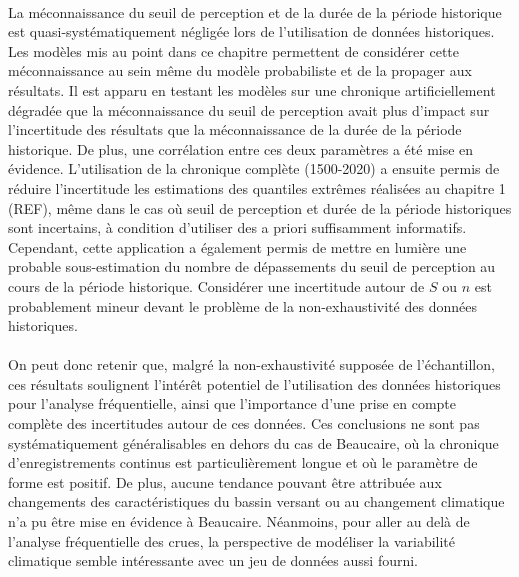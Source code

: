 \documentclass[11pt]{article}
\begin{document}
	\paragraph{} La méconnaissance du seuil de perception et de la durée de la période historique est quasi-systématiquement négligée lors de l'utilisation de données historiques. Les modèles mis au point dans ce chapitre permettent de considérer cette méconnaissance au sein même du modèle probabiliste et de la propager aux résultats. Il est apparu en testant les modèles sur une chronique artificiellement dégradée que la méconnaissance du seuil de perception avait plus d'impact sur l'incertitude des résultats que la méconnaissance de la durée de la période historique. De plus, une corrélation entre ces deux paramètres a été mise en évidence. L'utilisation de la chronique complète (1500-2020) a ensuite permis de réduire l'incertitude les estimations des quantiles extrêmes réalisées au chapitre 1 (REF), même dans le cas où seuil de perception et durée de la période historiques sont incertains, à condition d'utiliser des a priori suffisamment informatifs. Cependant, cette application a également permis de mettre en lumière une probable sous-estimation du nombre de dépassements du seuil de perception au cours de la période historique. Considérer une incertitude autour de $S$ ou $n$ est probablement mineur devant le problème de la non-exhaustivité des données historiques.

	\paragraph{} On peut donc retenir que, malgré la non-exhaustivité supposée de l'échantillon, ces résultats soulignent l'intérêt potentiel de l'utilisation des données historiques pour l'analyse fréquentielle, ainsi que l'importance d'une prise en compte complète des incertitudes autour de ces données. Ces conclusions ne sont pas systématiquement généralisables en dehors du cas de Beaucaire, où la chronique d'enregistrements continus est particulièrement longue et où le paramètre de forme est positif. De plus, aucune tendance pouvant être attribuée aux changements des caractéristiques du bassin versant ou au changement climatique n'a pu être mise en évidence à Beaucaire. Néanmoins, pour aller au delà de l'analyse fréquentielle des crues, la perspective de modéliser la variabilité climatique semble intéressante avec un jeu de données aussi fourni.



\printbibliography[title=Bibliographie]
\end{document}
